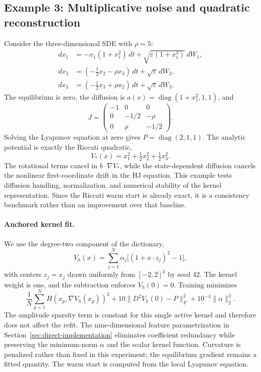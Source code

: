\documentclass[11pt]{article}
\theoremstyle{plain}      %
\theoremstyle{definition} %
\begin{document}
\subsection{Example 3: Multiplicative noise and quadratic reconstruction}\label{sec:example3_kernels}
Consider the three-dimensional SDE with $\rho=5$:
\begin{equation}\label{eq:example3-sde}
\begin{aligned}
 dx_1&=-x_1(1+x_1^2)\,dt+\sqrt{\varepsilon(1+x_1^2)}\,dW_1,\\
 dx_2&=(-\tfrac12x_2-\rho x_3)\,dt+\sqrt\varepsilon\,dW_2,\\
 dx_3&=(-\tfrac12x_3+\rho x_2)\,dt+\sqrt\varepsilon\,dW_3.
\end{aligned}
\end{equation}
The equilibrium is zero, the diffusion is $a(x)=\operatorname{diag}(1+x_1^2,1,1)$, and
\[
 J=\begin{pmatrix}-1&0&0\\0&-1/2&-\rho\\0&\rho&-1/2\end{pmatrix}.
\]
Solving the Lyapunov equation at zero gives $P=\operatorname{diag}(2,1,1)$. The analytic potential is exactly the Riccati quadratic,
\begin{equation}\label{eq:example3-reference}
 V_*(x)=x_1^2+\tfrac12x_2^2+\tfrac12x_3^2.
\end{equation}
The rotational terms cancel in $b\cdot\nabla V_*$, while the state-dependent diffusion cancels the nonlinear first-coordinate drift in the HJ equation. This example tests diffusion handling, normalization, and numerical stability of the kernel representation. Since the Riccati warm start is already exact, it is a consistency benchmark rather than an improvement over that baseline.

\paragraph{Anchored kernel fit.}
We use the degree-two component of the dictionary,
\[
 V_h(x)=\sum_{j=1}^{N}\alpha_j\bigl[(1+x\cdot z_j)^2-1\bigr],
\]
with centers $z_j=x_j$ drawn uniformly from $[-2,2]^3$ by seed 42. The kernel weight is one, and the subtraction enforces $V_h(0)=0$. Training minimizes
\begin{equation}\label{eq:quadratic-refit-loss}
 \frac1N\sum_{p=1}^N H(x_p,\nabla V_h(x_p))^2
 +10\|D^2V_h(0)-P\|_F^2+10^{-4}\|\alpha\|_2^2.
\end{equation}
The amplitude sparsity term is constant for this single active kernel and therefore does not affect the refit. The nine-dimensional feature parametrization in Section~\ref{sec:direct-implementation} eliminates coefficient redundancy while preserving the minimum-norm $\alpha$ and the scalar kernel function. Curvature is penalized rather than fixed in this experiment; the equilibrium gradient remains a fitted quantity. The warm start is computed from the local Lyapunov equation.
\end{document}
